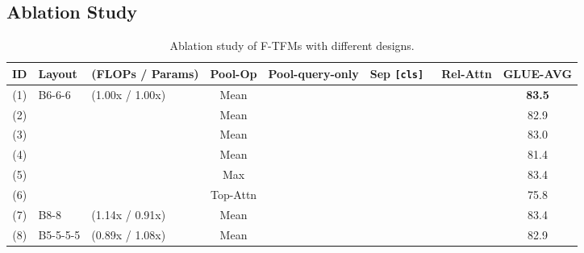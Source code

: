 \documentclass{article}
\theoremstyle{custom}
\newcommand{\cls}{\texttt{[cls]}~}
\begin{document}
\subsection{Ablation Study}
\label{sec:ablation}
\begin{table}[!ht]
	\small
	\centering
	\begin{tabular}{@{}c|l@{\hskip 0.05in}lcccc|c@{}}
		\toprule
		ID & Layout &(FLOPs / Params) & Pool-Op & Pool-query-only & Sep \cls & Rel-Attn & GLUE-AVG  \\
		\midrule
		(1)& B6-6-6 & (1.00x / 1.00x)
		& Mean     & \checkmark & \checkmark & \checkmark & \bf 83.5 \\
		(2)&&& Mean     & \checkmark &            & \checkmark & 82.9 \\
		(3)&&& Mean     &            & \checkmark & \checkmark & 83.0 \\
		(4)&&& Mean     & \checkmark & \checkmark &            & 81.4 \\
		(5)&&& Max      & \checkmark & \checkmark & \checkmark & 83.4 \\
		(6)&&& Top-Attn & \checkmark & \checkmark & \checkmark & 75.8 \\
		(7)& B8-8  & (1.14x / 0.91x)
		& Mean     & \checkmark & \checkmark & \checkmark & 83.4 \\
		(8)& B5-5-5-5 & (0.89x / 1.08x)
		& Mean     & \checkmark & \checkmark & \checkmark & 82.9 \\
		\bottomrule
	\end{tabular}
	\caption{Ablation study of F-TFMs with different designs.}
	\label{tab:ablation}
\end{table}
\end{document}
